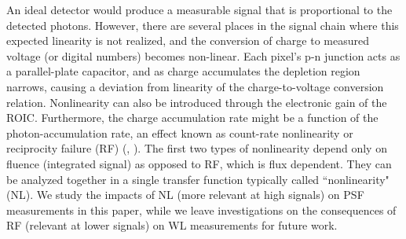 \documentclass[11pt,preprint,flushrt]{aastex}
\begin{document}
An ideal detector would produce a measurable signal that is proportional to the detected photons. However, there are several places in the signal chain where this expected linearity is not realized, and the conversion of charge to measured voltage (or digital numbers) becomes non-linear. Each pixel's p-n junction acts as a parallel-plate capacitor, and as charge accumulates the depletion region narrows, causing a deviation from linearity of the charge-to-voltage conversion relation. Nonlinearity can also be introduced through the electronic gain of the ROIC. Furthermore, the charge accumulation rate might be a function of the photon-accumulation rate, an effect known as count-rate nonlinearity or reciprocity failure (RF) (\citealt{smith08}, \citealt{biesiadzinski11}). 
The first two types of nonlinearity depend only on fluence (integrated signal) as opposed to RF, which is flux dependent.  They can be analyzed together in a single transfer function typically called ``nonlinearity" (NL). We study the impacts of NL (more relevant at high signals) on PSF measurements in this paper, while we leave investigations on the consequences of RF (relevant at lower signals) on WL measurements for future work. 
\end{document}

